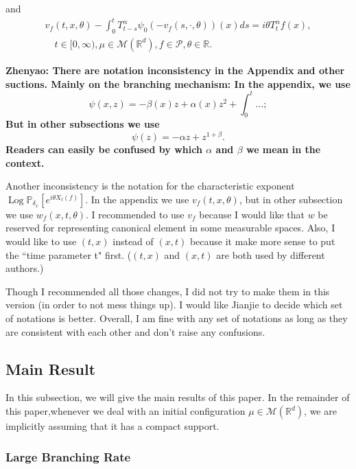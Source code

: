 \documentclass[12pt, a4paper]{amsart}
\theoremstyle{definition}
\numberwithin{equation}{section}
\begin{document}
and
\begin{align}
\label{eq:chareq2}
    v_f(t,x,\theta)-\int_0^t T^{\alpha}_{t-s} \psi_0(-v_f(s,\cdot,\theta))(x)ds=i\theta T^{\alpha}_t f(x),
    \\ \quad t\in [0,\infty), \mu\in \mathcal M(\mathbb R^d), f\in \mathcal P, \theta \in \mathbb R.
\end{align}
    {\bf Zhenyao: There are notation inconsistency in the Appendix and other suctions. Mainly on the branching mechanism: In the appendix, we use
\[
    \psi(x,z)= -\beta(x)z+\alpha(x)z^2 + \int_0^t \dots;
\]
    But in other subsections we use
\[
    \psi(z) = - \alpha z + z^{1+\beta}.
\]
    Readers can easily be confused by which $\alpha$ and $\beta$ we mean in the context.

    Another inconsistency is the notation for the characteristic exponent $\operatorname{Log} \mathbb P_{\delta_x}[e^{i\theta X_t(f)}]$. In the appendix we use $v_f(t,x,\theta)$, but in other subsection we use $w_f(x,t,\theta)$. I recommended to use $v_f$ because I would like that $w$ be reserved for representing canonical element in some measurable spaces. Also, I would like to use $(t,x)$ instead of $(x,t)$ because it make more sense to put the ``time parameter t" first. ($(t,x)$ and $(x,t)$ are both used by different authors.)

    Though I recommended all those changes, I did not try to make them in this version (in order to not mess things up). I would like Jianjie to decide which set of notations is better. Overall, I am fine with any set of notations as long as they are consistent with each other and don't raise any confusions.}

\subsection{Main Result}

In this subsection, we will give the main results of this paper. In the remainder of this paper,whenever we deal with an initial configuration $\mu \in \mathcal{M}(\mathbb{R}^d)$, we are implicitly assuming that it has a compact support.
\subsubsection{Large Branching Rate}
\end{document}
